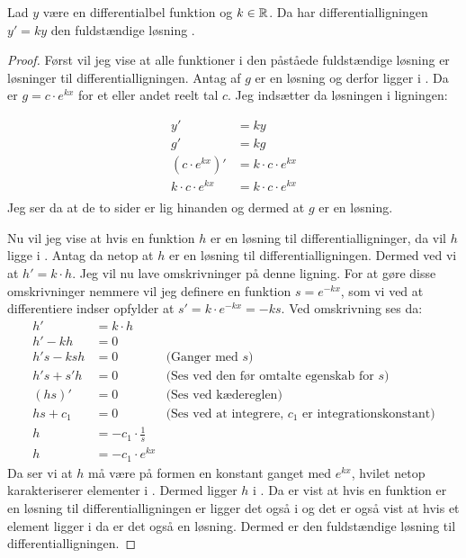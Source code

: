 \begin{thm}\label{thm:y'=k*y}
Lad $y$ være en differentialbel funktion og $k\in \mathbb{R}$. Da har  differentialligningen $y' = ky$ den fuldstændige løsning \LosEks.
\end{thm}
\begin{proof}
Først vil jeg vise at alle funktioner i den påståede fuldstændige løsning er løsninger til differentialligningen.
Antag af $g$ er en løsning og derfor ligger i \LosEks .
Da er $g=c\cdot e^{kx}$ for et eller andet reelt tal $c$.
Jeg indsætter da løsningen i ligningen: 

\begin{align*}
y' &= ky\\
g' &= kg\\
(c\cdot e^{kx})' &= k\cdot c\cdot e^{kx}\\
k\cdot c\cdot e^{kx} &= k\cdot c\cdot e^{kx}\\
\end{align*}
Jeg ser da at de to sider er lig hinanden og dermed at $g$ er en løsning. 

Nu vil jeg vise at hvis en funktion $h$ er en løsning til differentialligninger, da vil $h$ ligge i \LosEks.
Antag da netop at $h$ er en løsning til differentialligningen. 
Dermed ved vi at $h'=k\cdot h$.
Jeg vil nu lave omskrivninger på denne ligning. 
For at gøre disse omskrivninger nemmere vil jeg definere en funktion $s=e^{-kx}$, som vi ved at differentiere indser opfylder at $s'=k \cdot e^{-kx} = -ks$.
Ved omskrivning ses da:
\begin{align*}
h'&=k\cdot h \\
h'-kh &= 0\\
h's-ksh&=0 		& \text{(Ganger med }s\text{)}\\
h's+s'h&=0		& \text{(Ses ved den før omtalte egenskab for $s$)}\\
(hs)'&=0		&\text{(Ses ved kædereglen)}\\
hs+c_1 &= 0		&\text{(Ses ved at integrere, $c_1$ er integrationskonstant)}\\
h&= -c_1 \cdot \frac{1}{s}\\
h&= -c_1 \cdot e^{kx}
\end{align*}
Da ser vi at $h$ må være på formen en konstant ganget med $e^{kx}$, hvilet netop karakteriserer elementer i \LosEks. 
Dermed ligger $h$ i \LosEks.
Da er vist at hvis en funktion er en løsning til differentialligningen er ligger det også i \LosEks og det er også vist at hvis et element ligger i \LosEks da er det også en løsning. 
Dermed er \LosEks den fuldstændige løsning til differentialligningen. 
\end{proof}


